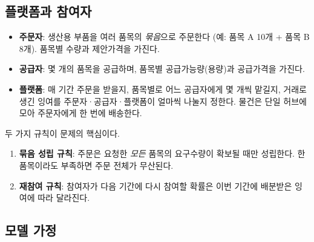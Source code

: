 \documentclass[11pt,a4paper]{article}
\begin{document}
\subsection{플랫폼과 참여자}

\begin{itemize}[leftmargin=1.5em]
  \item \textbf{주문자}: 생산용 부품을 여러 품목의 \emph{묶음}으로 주문한다
        (예: 품목 A 10개 + 품목 B 8개). 품목별 수량과 제안가격을 가진다.
  \item \textbf{공급자}: 몇 개의 품목을 공급하며, 품목별 공급가능량(용량)과 공급가격을 가진다.
  \item \textbf{플랫폼}: 매 기간 주문을 받을지, 품목별로 어느 공급자에게 몇 개씩 맡길지,
        거래로 생긴 잉여를 주문자·공급자·플랫폼이 얼마씩 나눌지 정한다.
        물건은 단일 허브에 모아 주문자에게 한 번에 배송한다.
\end{itemize}

두 가지 규칙이 문제의 핵심이다.
\begin{enumerate}[leftmargin=1.5em]
  \item \textbf{묶음 성립 규칙}: 주문은 요청한 \emph{모든} 품목의 요구수량이 확보될 때만 성립한다.
        한 품목이라도 부족하면 주문 전체가 무산된다.
  \item \textbf{재참여 규칙}: 참여자가 다음 기간에 다시 참여할 확률은
        이번 기간에 배분받은 잉여에 따라 달라진다.
\end{enumerate}

\subsection{모델 가정}
\end{document}
